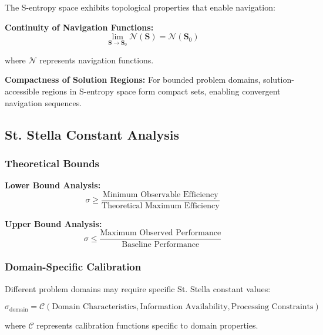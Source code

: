 \documentclass[11pt]{article}
\begin{document}
The S-entropy space exhibits topological properties that enable navigation:

\textbf{Continuity of Navigation Functions:}
\begin{equation}
\lim_{\mathbf{S} \to \mathbf{S}_0} \mathcal{N}(\mathbf{S}) = \mathcal{N}(\mathbf{S}_0)
\label{eq:navigation_continuity}
\end{equation}

where $\mathcal{N}$ represents navigation functions.

\textbf{Compactness of Solution Regions:}
For bounded problem domains, solution-accessible regions in S-entropy space form compact sets, enabling convergent navigation sequences.

\subsection{St. Stella Constant Analysis}

\subsubsection{Theoretical Bounds}

\textbf{Lower Bound Analysis:}
\begin{equation}
\sigma \geq \frac{\text{Minimum Observable Efficiency}}{\text{Theoretical Maximum Efficiency}}
\label{eq:stella_lower_bound}
\end{equation}

\textbf{Upper Bound Analysis:}
\begin{equation}
\sigma \leq \frac{\text{Maximum Observed Performance}}{\text{Baseline Performance}}
\label{eq:stella_upper_bound}
\end{equation}

\subsubsection{Domain-Specific Calibration}

Different problem domains may require specific St. Stella constant values:

\begin{equation}
\sigma_{\text{domain}} = \mathcal{C}(\text{Domain Characteristics}, \text{Information Availability}, \text{Processing Constraints})
\label{eq:domain_specific_stella}
\end{equation}

where $\mathcal{C}$ represents calibration functions specific to domain properties.
\end{document}
